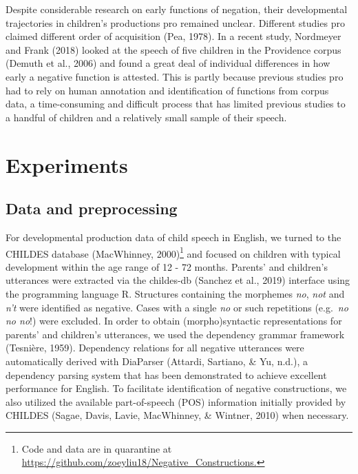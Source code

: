 \documentclass[
  english,
  man,floatsintext]{apa6}
\begin{document}
Despite considerable research on early functions of negation, their developmental trajectories in children's productions pro remained unclear. Different studies pro claimed different order of acquisition (Pea, 1978). In a recent study, Nordmeyer and Frank (2018) looked at the speech of five children in the Providence corpus (Demuth et al., 2006) and found a great deal of individual differences in how early a negative function is attested. This is partly because previous studies pro had to rely on human annotation and identification of functions from corpus data, a time-consuming and difficult process that has limited previous studies to a handful of children and a relatively small sample of their speech.

\clearpage

\hypertarget{experiments}{%
\section{Experiments}\label{experiments}}

\hypertarget{data-and-preprocessing}{%
\subsection{Data and preprocessing}\label{data-and-preprocessing}}

For developmental production data of child speech in English, we turned to the CHILDES database (MacWhinney, 2000)\footnote{Code and data are in quarantine at \url{https://github.com/zoeyliu18/Negative_Constructions.}} and focused on children with typical development within the age range of 12 - 72 months. Parents' and children's utterances were extracted via the childes-db (Sanchez et al., 2019) interface using the programming language R. Structures containing the morphemes \emph{no}, \emph{not} and \emph{n't} were identified as negative. Cases with a single \emph{no} or such repetitions (e.g.~\emph{no no no}!) were excluded. In order to obtain (morpho)syntactic representations for parents' and children's utterances, we used the dependency grammar framework (Tesnière, 1959). Dependency relations for all negative utterances were automatically derived with DiaParser (Attardi, Sartiano, \& Yu, n.d.), a dependency parsing system that has been demonstrated to achieve excellent performance for English. To facilitate identification of negative constructions, we also utilized the available part-of-speech (POS) information initially provided by CHILDES (Sagae, Davis, Lavie, MacWhinney, \& Wintner, 2010) when necessary.
\end{document}

